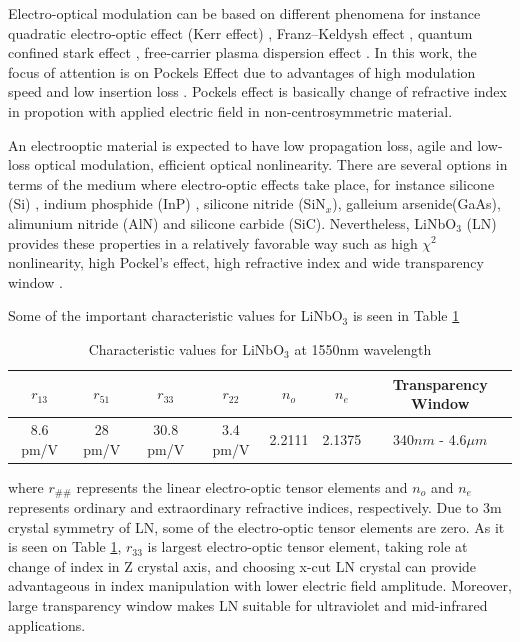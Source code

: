 \documentclass[thesis]{deutez}
\begin{document}

    Electro-optical modulation can be based on different phenomena for instance 
    quadratic electro-optic effect (Kerr effect) \cite{4}, Franz–Keldysh effect \cite{5}, quantum confined stark effect \cite{5}, free-carrier plasma dispersion effect \cite{3}. In this work, the focus of attention is on Pockels Effect due to advantages of high modulation speed and low insertion loss \cite{5}. Pockels effect is basically change of refractive index in propotion with applied electric field in non-centrosymmetric material. 
     
    An electrooptic material is expected to have low propagation loss, agile and low-loss optical modulation, efficient optical nonlinearity. There are several options in terms of the medium where electro-optic effects take place, for instance silicone (Si) \cite{6}, indium phosphide (InP) \cite{7}, silicone nitride (SiN$_x$), galleium arsenide(GaAs), alimunium nitride (AlN) and silicone carbide (SiC). Nevertheless, LiNbO$_3$ (LN) provides these properties in a relatively favorable way such as high $\chi^2$ nonlinearity, high Pockel's effect, high refractive index and wide transparency window \cite{1}. 
    
    \newpage
    
    Some of the important characteristic values for LiNbO$_3$ is seen in Table \ref{tab:ln_characteristics}
    
    

    \begin{table}[h]
        \centering
        \begin{tabular}{c|c|c|c|c|c|c}
            $r_{13}$ & $r_{51}$ & $r_{33}$ & $r_{22}$ & $n_o$ & $n_e$ & Transparency Window \\ \hline
            8.6 pm/V & 28 pm/V & 30.8 pm/V & 3.4 pm/V& 2.2111 & 2.1375 & 340$nm$ - 4.6$\mu m$
        \end{tabular}
        \caption{Characteristic values for LiNbO$_3$ at 1550nm wavelength \cite{8}}
        \label{tab:ln_characteristics}
    \end{table}
    
    where $r_{\#\#}$ represents the linear electro-optic tensor elements and $n_o$ and $n_e$ represents ordinary and extraordinary refractive indices, respectively. Due to 3m crystal symmetry of LN, some of the electro-optic tensor elements are zero. As it is seen on Table \ref{tab:ln_characteristics}, $r_{33}$ is largest electro-optic tensor element, taking role at change of index in Z crystal axis, and choosing x-cut LN crystal can provide advantageous in index manipulation with lower electric field amplitude. Moreover, large transparency window makes LN suitable for ultraviolet and mid-infrared applications.
   
\end{document}
